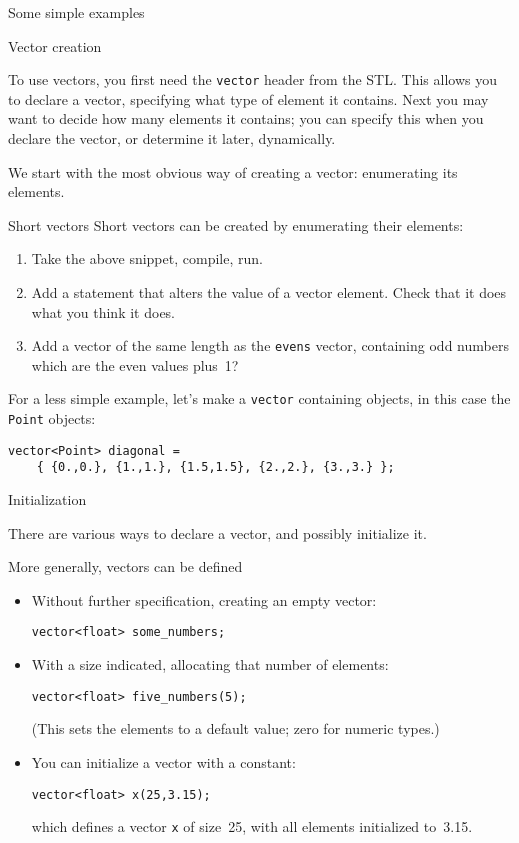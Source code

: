  {Some simple examples}

 {Vector creation}

To use vectors, you first need the \lstinline{vector} header from the \ac{STL}.
This allows you to declare a vector, specifying what type of element
it contains. Next you may want to decide how many elements it
contains; you can specify this when you declare the vector, or
determine it later, dynamically.

We start with the most obvious way of creating a vector:
enumerating its elements.

\begin{block}{Short vectors}
  \label{sl:vectorshort}
  Short vectors can be created by enumerating their elements:
  \lstset{style=snippetcode}
\end{block}

\begin{exercise}
  \label{ex:shortvectoralter}
  \begin{enumerate}
  \item
    Take the above snippet, compile, run.
  \item Add a statement that alters the value of a vector element.
    Check that it does what you think it does.
  \item Add a vector of the same length as the \lstinline{evens} vector,
    containing odd numbers
    which are the even values plus~1?
  \end{enumerate}
\end{exercise}

For a less simple example, let's make a \lstinline{vector}
containing objects, in this case the \lstinline{Point} objects:
\begin{lstlisting}
vector<Point> diagonal = 
    { {0.,0.}, {1.,1.}, {1.5,1.5}, {2.,2.}, {3.,3.} };
\end{lstlisting}

 {Initialization}

There are various ways to declare a vector, and possibly initialize it.

More generally, vectors can be defined
\begin{itemize}
\item Without further specification, creating an empty vector:
\begin{lstlisting}
vector<float> some_numbers;
\end{lstlisting}
\item With a size indicated, allocating that number of elements:
\begin{lstlisting}
vector<float> five_numbers(5);
\end{lstlisting}
(This sets the elements to a default value; zero for numeric types.)
\item You can initialize a vector with a constant:
\begin{lstlisting}
vector<float> x(25,3.15);
\end{lstlisting}
which defines a vector \lstinline{x} of size~25,
with all elements initialized to~3.15.
\end{itemize}

